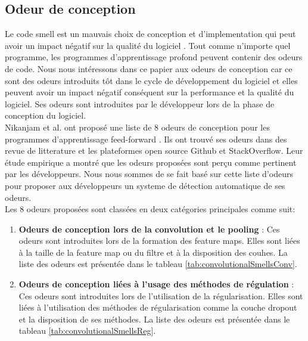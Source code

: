 \subsection{Odeur de conception}
Le code smell est un mauvais choix de conception et d'implementation qui peut
avoir un impact négatif sur la qualité du logiciel \cite{fowler1997refactoring}.
Tout comme n'importe quel programme, les programmes d'apprentissage profond
peuvent contenir des odeurs de code. Nous nous intéressons dans ce papier aux
odeurs de conception car ce sont des odeurs introduits tôt dans le cycle de
développement du logiciel et elles peuvent avoir un impact négatif conséquent
sur la performance et la qualité du logiciel. Ses odeurs sont introduites par le
développeur lors de la phase de  conception du logiciel.\\ Nikanjam et al. ont
proposé une liste de 8 odeurs de conception pour les programmes d'apprentissage
feed-forward \cite{nikanjam2019deep}. Ils ont trouvé ses odeurs dans des revue
de litterature et les plateformes open source Github et StackOverflow. Leur étude empirique a montré que les
odeurs proposées sont perçu comme pertinent par les développeurs. Nous nous
sommes de se fait basé sur cette liste d'odeurs pour proposer aux développeurs
un systeme de détection automatique de ses odeurs.\\ Les 8 odeurs proposées sont
classées en deux catégories principales comme suit:
\begin{enumerate}
    \item \textbf{Odeurs de conception lors de la convolution et le pooling} : Ces
          odeurs sont introduites lors de la formation des feature maps. Elles sont liées
          à la taille de la feature map ou du filtre et à la disposition des couhes. La liste des odeurs est présentée dans le tableau \ref{tab:convolutionalSmellsConv}.
    \item \textbf{Odeurs de conception liées à l'usage des méthodes de régulation} : Ces odeurs sont
          introduites lors de l'utilisation de la régularisation. Elles sont liées à
          l'utilisation des méthodes de régularisation comme la couche dropout et la
          disposition de ses méthodes. La liste des odeurs est présentée dans le tableau \ref{tab:convolutionalSmellsReg}.
\end{enumerate}


